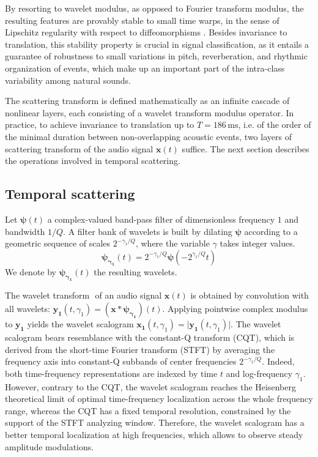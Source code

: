 \documentclass[journal]{IEEEtran}
\makeatletter
\newcommand*{\ie}{i.e.\@\xspace}
\makeatother
\begin{document}
By resorting to wavelet modulus, as opposed to Fourier transform modulus, the resulting features are provably stable to small time warps,
in the sense of Lipschitz regularity with respect to diffeomorphisms \cite{Mallat2010}.
Besides invariance to translation, this stability property is crucial in signal classification, as it entails a guarantee of robustness to small variations in pitch, reverberation, and rhythmic organization of events, which make up an important part of the intra-class variability among natural sounds.

The scattering transform is defined mathematically as an infinite cascade of nonlinear layers, each consisting of a wavelet transform modulus operator.
In practice, to achieve invariance to translation up to $T = 186\,\mathrm{ms}$, \ie of the order of the minimal duration between non-overlapping acoustic events, two layers of scattering transform of the audio signal $\boldsymbol{x}(t)$ suffice.
The next section describes the operations involved in temporal scattering.

\subsection{Temporal scattering}
Let $\boldsymbol{\psi}(t)$ a complex-valued band-pass filter of
dimensionless frequency $1$ and bandwidth $1/Q$.
A filter bank of wavelets is built by dilating $\boldsymbol{\psi}$
according to a geometric sequence of scales $2^{-\gamma_1/Q}$,
where the variable $\gamma$ takes integer values.
\begin{equation}
\boldsymbol{\psi_{\gamma_1}}(t) = 2^{-\gamma_1/Q} \boldsymbol{\psi}(-2^{\gamma_1/Q} t)
\end{equation}
We denote by $\boldsymbol{\psi_{\gamma_1}}(t)$ the resulting wavelets.

The wavelet transform $\boldsymbol{}$ of an audio signal
$\boldsymbol{x}(t)$ is obtained by convolution with all wavelets:
$\boldsymbol{y_1}(t, \gamma_1) =
(\boldsymbol{x} \ast \boldsymbol{\psi_{\gamma_1}})(t)$.
Applying pointwise complex modulus to $\boldsymbol{y_1}$ yields
the wavelet scalogram
$\boldsymbol{x_1}(t, \gamma_1) = \vert \boldsymbol{y_1}(t, \gamma_1)\vert$.
The wavelet scalogram bears resemblance with the constant-Q transform (CQT),
which is derived from the short-time Fourier transform (STFT) by averaging the frequency
axis into constant-Q subbands of center frequencies $2^{-\gamma_1/Q}$.
Indeed, both time-frequency representations are indexed by time $t$ and log-frequency $\gamma_1$.
However, contrary to the CQT, the wavelet scalogram reaches the Heisenberg
theoretical limit of optimal time-frequency localization across the whole
frequency range, whereas the CQT has a fixed temporal resolution, constrained by the support of the STFT analyzing window.
Therefore, the wavelet scalogram has a better temporal localization at high
frequencies, which allows to observe steady amplitude modulations.
\end{document}
